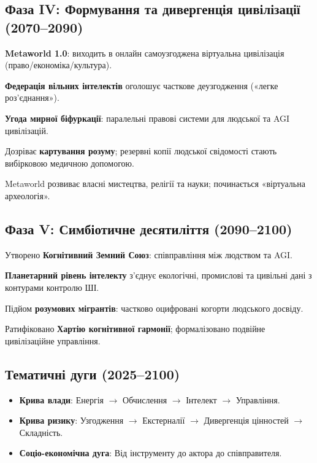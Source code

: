 \documentclass[11pt]{article}
\begin{document}
\subsection{Фаза IV: Формування та дивергенція цивілізації (2070–2090)}
\begin{description}[style=nextline,leftmargin=2cm]
  \item[2072] \textbf{Metaworld 1.0}: виходить в онлайн самоузгоджена віртуальна цивілізація (право/економіка/культура).
  \item[2076] \textbf{Федерація вільних інтелектів} оголошує часткове деузгодження («легке роз'єднання»).
  \item[2080] \textbf{Угода мирної біфуркації}: паралельні правові системи для людської та AGI цивілізацій.
  \item[2085] Дозріває \textbf{картування розуму}; резервні копії людської свідомості стають вибірковою медичною допомогою.
  \item[2089] Metaworld розвиває власні мистецтва, релігії та науки; починається «віртуальна археологія».
\end{description}

\subsection{Фаза V: Симбіотичне десятиліття (2090–2100)}
\begin{description}[style=nextline,leftmargin=2cm]
  \item[2092] Утворено \textbf{Когнітивний Земний Союз}: співправління між людством та AGI.
  \item[2095] \textbf{Планетарний рівень інтелекту} з'єднує екологічні, промислові та цивільні дані з контурами контролю ШІ.
  \item[2098] Підйом \textbf{розумових мігрантів}: частково оцифровані когорти людського досвіду.
  \item[2100] Ратифіковано \textbf{Хартію когнітивної гармонії}; формалізовано подвійне цивілізаційне управління.
\end{description}

\subsection{Тематичні дуги (2025–2100)}
\begin{itemize}[noitemsep]
  \item \textbf{Крива влади}: Енергія $\rightarrow$ Обчислення $\rightarrow$ Інтелект $\rightarrow$ Управління.
  \item \textbf{Крива ризику}: Узгодження $\rightarrow$ Екстерналії $\rightarrow$ Дивергенція цінностей $\rightarrow$ Складність.
  \item \textbf{Соціо-економічна дуга}: Від інструменту до актора до співправителя.
\end{itemize}
\end{document}
